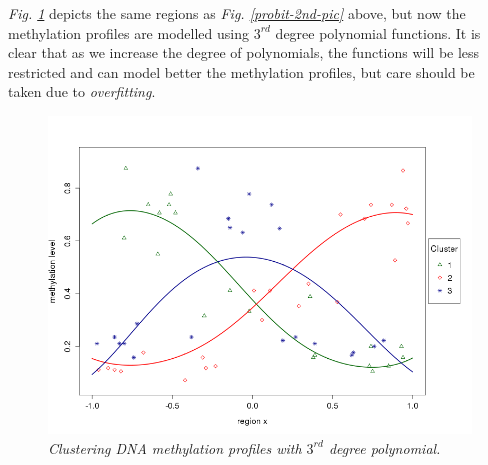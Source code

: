 \emph{Fig. \ref{probit-3rd-pic}} depicts the same regions as \emph{Fig. \ref{probit-2nd-pic}} above, but now the methylation profiles are modelled using $3^{rd}$ degree polynomial functions. It is clear that as we increase the degree of polynomials, the functions will be less restricted and can model better the methylation profiles, but care should be taken due to \emph{overfitting}.
\begin{figure}[!ht]
\begin{center}
 \includegraphics[scale = 0.40]{images/probit3rd.png}
\caption{\emph{Clustering DNA methylation profiles with $3^{rd}$ degree polynomial.}}
\label{probit-3rd-pic}
\end{center}
\end{figure}